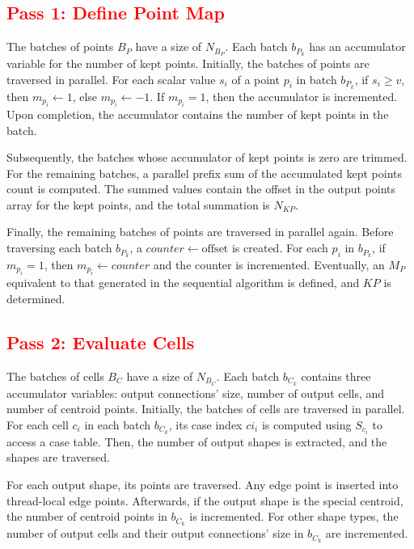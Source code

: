 \documentclass{egpubl}
\newcommand*{\fix}[1]{\textcolor{red}{#1}}
\begin{document}
\subsection{\fix{Pass 1: Define Point Map}}
\label{sec:par-pass-1}

The batches of points $B_P$ have a size of $N_{B_P}$. Each batch $b_{P_k}$ has an accumulator variable for the number of kept points. Initially, the batches of points are traversed in parallel. For each scalar value $s_i$ of a point $p_i$ in batch $b_{P_k}$, if $s_i \ge v$, then $m_{p_i} \gets 1$, else $m_{p_i} \gets -1$. If $m_{p_i} = 1$, then the accumulator is incremented. Upon completion, the accumulator contains the number of kept points in the batch.

Subsequently, the batches whose accumulator of kept points is zero are trimmed. For the remaining batches, a parallel prefix sum of the accumulated kept points count is computed. The summed values contain the offset in the output points array for the kept points, and the total summation is $N_{KP}$.

Finally, the remaining batches of points are traversed in parallel again. Before traversing each batch $b_{P_k}$, a $counter \gets \text{offset}$ is created. For each $p_i$ in $b_{P_k}$, if $m_{p_i} = 1$, then $m_{p_i} \gets counter$ and the counter is incremented. Eventually, an $M_P$ equivalent to that generated in the sequential algorithm is defined, and $KP$ is determined.

\subsection{\fix{Pass 2: Evaluate Cells}}

The batches of cells $B_C$ have a size of $N_{B_C}$. Each batch $b_{C_k}$ contains three accumulator variables: output connections' size, number of output cells, and number of centroid points. Initially, the batches of cells are traversed in parallel. For each cell $c_i$ in each batch $b_{C_k}$, its case index $ci_i$ is computed using $S_{c_i}$ to access a case table. Then, the number of output shapes is extracted, and the shapes are traversed.

For each output shape, its points are traversed. Any edge point is inserted into thread-local edge points. Afterwards, if the output shape is the special centroid, the number of centroid points in $b_{C_k}$ is incremented. For other shape types, the number of output cells and their output connections' size in $b_{C_k}$ are incremented.
\end{document}
